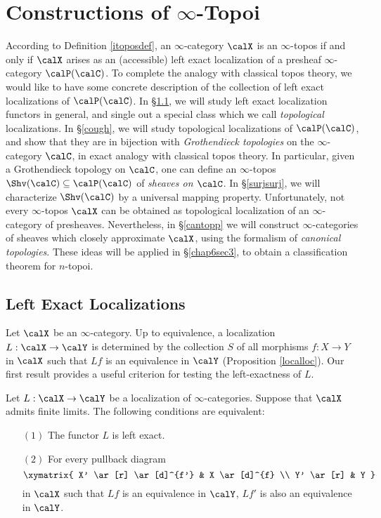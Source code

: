  
\section{Constructions of $\infty$-Topoi}\label{topcomp}

\setcounter{theorem}{0}

According to Definition \ref{itoposdef}, an $\infty$-category $\calX$ is an $\infty$-topos if and only if $\calX$ arises as an (accessible) left exact localization of a presheaf $\infty$-category $\calP(\calC)$. To complete the analogy with classical topos theory, we would like to have some concrete description of the collection of left exact localizations of $\calP(\calC)$. In \S \ref{leloc}, we will study left exact localization functors in general, and single out a special class which we call {\it topological} localizations. In \S \ref{cough}, we will study topological localizations of $\calP(\calC)$, and show that they are in bijection with {\it Grothendieck topologies} on the $\infty$-category $\calC$, in exact analogy with classical topos theory. In particular, given a Grothendieck topology on $\calC$, one can define an $\infty$-topos $\Shv(\calC) \subseteq \calP(\calC)$ of {\it sheaves on $\calC$}. In \S \ref{surjsurj}, we will characterize $\Shv(\calC)$ by a universal mapping property. 
Unfortunately, not every $\infty$-topos $\calX$ can be obtained as topological localization of an $\infty$-category of presheaves. Nevertheless, in \S \ref{cantopp} we will construct $\infty$-categories of sheaves which closely approximate $\calX$, using the formalism of {\it canonical topologies}. These ideas will be applied in \S \ref{chap6sec3}, to obtain a classification theorem for $n$-topoi.

\subsection{Left Exact Localizations}\label{leloc}

Let $\calX$ be an $\infty$-category. Up to equivalence, a localization $L: \calX \rightarrow \calY$
is determined by the collection $S$ of all morphisms $f: X \rightarrow Y$ in $\calX$ such that
$Lf$ is an equivalence in $\calY$ (Proposition \ref{localloc}). Our first result provides a useful criterion for testing the left-exactness of $L$.

\begin{proposition}\label{charleftloc}
Let $L: \calX \rightarrow \calY$ be a localization of $\infty$-categories. 
Suppose that $\calX$ admits finite limits. The following conditions are equivalent:
\begin{itemize}
\item[$(1)$] The functor $L$ is left exact.
\item[$(2)$] For every pullback diagram
$$ \xymatrix{ X' \ar[r] \ar[d]^{f'} & X \ar[d]^{f} \\
Y' \ar[r] & Y }$$ in $\calX$ such that $Lf$ is an equivalence in $\calY$,
$Lf'$ is also an equivalence in $\calY$.
\end{itemize}
\end{proposition}

